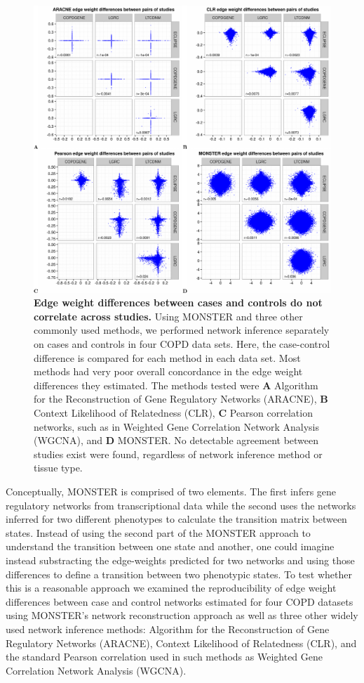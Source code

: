 \begin{figure}
\includegraphics[width=1\linewidth]{figures/SupportingFigure3}
\caption[Edge weight differences between cases and controls across studies]{\textbf{Edge weight differences between cases and controls do not correlate across studies.} Using MONSTER and three other commonly used methods, we performed network inference separately on cases and controls in four  COPD data sets. Here, the case-control difference is compared for each method in each data set. Most methods had very poor overall concordance in the edge weight differences they estimated. The methods tested were \textbf{A} Algorithm for the Reconstruction of Gene Regulatory Networks (ARACNE), \textbf{B} Context Likelihood of Relatedness (CLR), \textbf{C} Pearson correlation networks, such as in Weighted Gene Correlation Network Analysis (WGCNA), and \textbf{D} MONSTER. No detectable agreement between studies exist were found, regardless of network inference method or tissue type.} \label{fig:Supplement NI edgeweight plots}
\end{figure}

Conceptually, MONSTER is comprised of two elements. The first infers gene regulatory networks from transcriptional data while the second uses the networks inferred for two different phenotypes to calculate the transition matrix between states. Instead of using the second part of the MONSTER approach to understand the transition between one state and another, one could imagine instead substracting the edge-weights predicted for two networks and using those differences to define a transition between two phenotypic states. To test whether this is a reasonable approach we examined the reproducibility of edge weight differences between case and control networks estimated for four COPD datasets using MONSTER's network reconstruction approach as well as three other widely used network inference methods: Algorithm for the Reconstruction of Gene Regulatory Networks (ARACNE), Context Likelihood of Relatedness (CLR), and the standard Pearson correlation used in such methods as Weighted Gene Correlation Network Analysis (WGCNA). 

